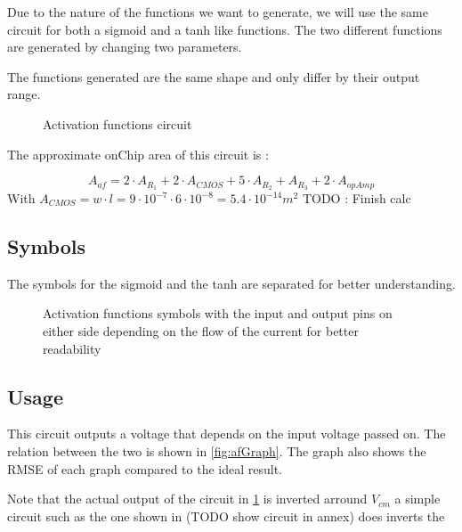 Due to the nature of the functions we want to generate, we will use the same circuit for both a sigmoid and a \ac{tanh} like functions. The two different functions are generated by changing two parameters.

The functions generated are the same shape and only differ by their output range.

\begin{figure}[H]
  \centering
  
  \caption{Activation functions circuit}
  \label{circt:af}
\end{figure}

The approximate onChip area of this circuit is :

\begin{equation}
  A_{af}=2\cdot A_{R_1} + 2\cdot A_{CMOS} + 5\cdot A_{R_2} + A_{R_3} +2\cdot A_{opAmp}
\end{equation}
With $A_{CMOS} = w\cdot l = 9\cdot 10^{-7} \cdot 6 \cdot 10^{-8} = 5.4 \cdot 10^{-14} m^2$
TODO : Finish calc



\subsection{Symbols}
The symbols for the sigmoid and the \ac{tanh} are separated for better understanding.

\begin{figure}[H]
  \centering
  \hspace*{0.8cm}
  \hfill
  \hspace*{0.8cm}
  \caption{Activation functions symbols with the input and output pins on either side depending on the flow of the current for better readability}
  \label{fig:afSymbol}
\end{figure}

\subsection{Usage}

This circuit outputs a voltage that depends on the input voltage passed on. The relation between the two is shown in \cref{fig:afGraph}. The graph also shows the \ac{RMSE} of each graph compared to the ideal result.

Note that the actual output of the circuit in \cref{circt:af} is inverted arround $V_{cm}$ a simple circuit such as the one shown in  (TODO show circuit in annex) does inverts the

